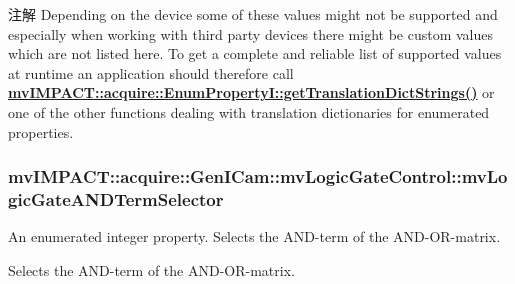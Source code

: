 \begin{DoxyNote}{注解}
Depending on the device some of these values might not be supported and especially when working with third party devices there might be custom values which are not listed here. To get a complete and reliable list of supported values at runtime an application should therefore call {\bfseries \hyperlink{classmv_i_m_p_a_c_t_1_1acquire_1_1_enum_property_i_a0ba6ccbf5ee69784d5d0b537924d26b6}{mv\+I\+M\+P\+A\+C\+T\+::acquire\+::\+Enum\+Property\+I\+::get\+Translation\+Dict\+Strings()}} or one of the other functions dealing with translation dictionaries for enumerated properties. 
\end{DoxyNote}
\hypertarget{classmv_i_m_p_a_c_t_1_1acquire_1_1_gen_i_cam_1_1mv_logic_gate_control_a28bfaafbd816387721c325710151f78d}{
\subsubsection[{mv\+Logic\+Gate\+A\+N\+D\+Term\+Selector}]{ mv\+I\+M\+P\+A\+C\+T\+::acquire\+::\+Gen\+I\+Cam\+::mv\+Logic\+Gate\+Control\+::mv\+Logic\+Gate\+A\+N\+D\+Term\+Selector}}\label{classmv_i_m_p_a_c_t_1_1acquire_1_1_gen_i_cam_1_1mv_logic_gate_control_a28bfaafbd816387721c325710151f78d}


An enumerated integer property. Selects the A\+N\+D-\/term of the A\+N\+D-\/\+O\+R-\/matrix. 

Selects the A\+N\+D-\/term of the A\+N\+D-\/\+O\+R-\/matrix.

